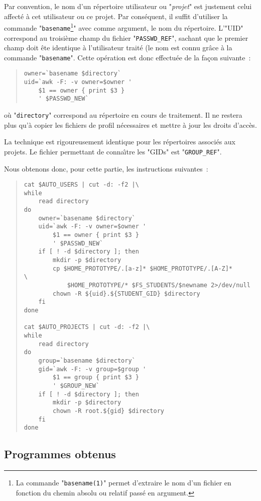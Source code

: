 Par convention, le nom d'un r{\'e}pertoire utilisateur ou "{\sl projet}" est justement
celui affect{\'e} {\`a} cet utilisateur ou ce projet. Par cons{\'e}quent, il suffit d'utiliser
la commande "{\tt basename}\footnote{La commande "{\tt basename(1)}" permet
d'extraire le nom d'un fichier en fonction du chemin absolu ou relatif pass{\'e} en
argument.}" avec comme argument, le nom du r{\'e}pertoire. L'"UID"
correspond au troisi{\`e}me champ du fichier "{\tt PASSWD\_REF}", sachant que le premier
champ doit {\^e}te identique {\`a} l'utilisateur trait{\'e} (le nom est connu gr{\^a}ce {\`a} la commande
"{\tt basename}". Cette op{\'e}ration est donc effectu{\'e}e de la fa\c{c}on suivante~:
\begin{quote}
\begin{verbatim}
owner=`basename $directory`
uid=`awk -F: -v owner=$owner '
    $1 == owner { print $3 }
    ' $PASSWD_NEW`
\end{verbatim}
\end{quote}
o{\`u} "{\tt directory}" correspond au r{\'e}pertoire en cours de traitement. Il ne restera plus
qu'{\`a} copier les fichiers de profil n{\'e}cessaires et mettre {\`a} jour les droits d'acc{\`e}s.

La technique est rigoureusement identique pour les r{\'e}pertoires associ{\'e}s aux projets. Le
fichier permettant de conna{\^\i}tre les "GIDs" est "{\tt GROUP\_REF}".

Nous obtenons donc, pour cette partie, les instructions suivantes~:
\begin{quote}
\begin{verbatim}
cat $AUTO_USERS | cut -d: -f2 |\
while
    read directory
do
    owner=`basename $directory`
    uid=`awk -F: -v owner=$owner '
        $1 == owner { print $3 }
        ' $PASSWD_NEW`
    if [ ! -d $directory ]; then
        mkdir -p $directory
        cp $HOME_PROTOTYPE/.[a-z]* $HOME_PROTOTYPE/.[A-Z]*      \
            $HOME_PROTOTYPE/* $FS_STUDENTS/$newname 2>/dev/null
        chown -R ${uid}.${STUDENT_GID} $directory
    fi
done

cat $AUTO_PROJECTS | cut -d: -f2 |\
while
    read directory
do
    group=`basename $directory`
    gid=`awk -F: -v group=$group '
        $1 == group { print $3 }
        ' $GROUP_NEW`
    if [ ! -d $directory ]; then
        mkdir -p $directory
        chown -R root.${gid} $directory
    fi
done
\end{verbatim}
\end{quote}

\subsection{\label{adv-programming-ex3-pgm}Programmes obtenus}

